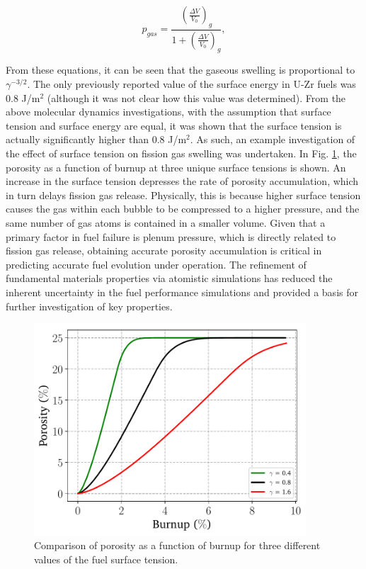 \documentclass[review]{elsarticle}
\begin{document}
\begin{equation}
  p_{gas} = \frac{\left(\frac{\Delta V}{V_0}\right)_{g}}{1 + \left(\frac{\Delta V}{V_0}\right)_{g}},
\end{equation}

From these equations, it can be seen that the gaseous swelling is proportional to $\gamma^{-3/2}$. The only previously reported value of the surface energy in U-Zr fuels was 0.8 J/m$^2$ \cite{tsuboi1992} (although it was not clear how this value was determined). From the above molecular dynamics investigations, with the assumption that surface tension and surface energy are equal, it was shown that the surface tension is actually significantly higher than 0.8 J/m$^2$. As such, an example investigation of the effect of surface tension on fission gas swelling was undertaken. In Fig. \ref{fig:plot_porosity_var_gamma}, the porosity as a function of burnup at three unique surface tensions is shown. An increase in the surface tension depresses the rate of porosity accumulation, which in turn delays fission gas release. Physically, this is because higher surface tension causes the gas within each bubble to be compressed to a higher pressure, and the same number of gas atoms is contained in a smaller volume. Given that a primary factor in fuel failure is plenum pressure, which is directly related to fission gas release, obtaining accurate porosity accumulation is critical in predicting accurate fuel evolution under operation. The refinement of fundamental materials properties via atomistic simulations has reduced the inherent uncertainty in the fuel performance simulations and provided a basis for further investigation of key properties. 

\begin{figure}[!htp]
\begin{center}
\includegraphics[keepaspectratio, width=4.0in]{11_plot_porosity_var_gamma}
\end{center}
\caption{Comparison of porosity as a function of burnup for three different values of the fuel surface tension.}
\label{fig:plot_porosity_var_gamma}
\end{figure}
\end{document}
